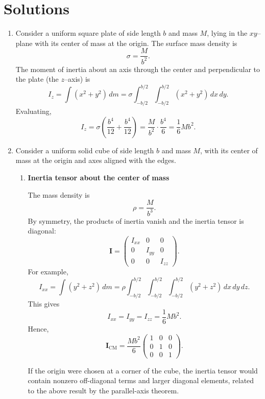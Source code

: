\documentclass[../main.tex]{subfiles}
\begin{document}
\maketitle

\section*{Solutions}

\begin{enumerate}

\item Consider a uniform square plate of side length $b$ and mass $M$, lying in the $xy$--plane with its center of mass at the origin.  
The surface mass density is
\[
\sigma=\frac{M}{b^2}.
\]
The moment of inertia about an axis through the center and perpendicular to the plate (the $z$--axis) is
\[
I_z=\int (x^2+y^2)\,dm
=\sigma\int_{-b/2}^{b/2}\int_{-b/2}^{b/2}(x^2+y^2)\,dx\,dy.
\]
Evaluating,
\[
I_z=\sigma\left(\frac{b^4}{12}+\frac{b^4}{12}\right)
=\frac{M}{b^2}\cdot\frac{b^4}{6}
=\frac{1}{6}Mb^2.
\]


\item Consider a uniform solid cube of side length $b$ and mass $M$, with its center of mass at the origin and axes aligned with the edges.

\begin{enumerate}

\item \textbf{Inertia tensor about the center of mass}

The mass density is
\[
\rho=\frac{M}{b^3}.
\]
By symmetry, the products of inertia vanish and the inertia tensor is diagonal:
\[
\mathbf I=
\begin{pmatrix}
I_{xx} & 0 & 0\\
0 & I_{yy} & 0\\
0 & 0 & I_{zz}
\end{pmatrix}.
\]
For example,
\[
I_{xx}=\int (y^2+z^2)\,dm
=\rho\int_{-b/2}^{b/2}\!\!\int_{-b/2}^{b/2}\!\!\int_{-b/2}^{b/2}(y^2+z^2)\,dx\,dy\,dz.
\]
This gives
\[
I_{xx}=I_{yy}=I_{zz}=\frac{1}{6}Mb^2.
\]
Hence,
\[
\mathbf I_{\text{CM}}=\frac{Mb^2}{6}
\begin{pmatrix}
1&0&0\\
0&1&0\\
0&0&1
\end{pmatrix}.
\]

If the origin were chosen at a corner of the cube, the inertia tensor would contain nonzero off-diagonal terms and larger diagonal elements, related to the above result by the parallel-axis theorem.


\end{enumerate}
\end{enumerate}
\end{document}
